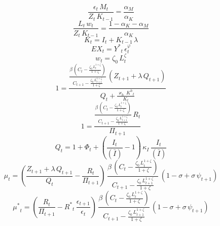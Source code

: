 \begin{dmath}
\frac{{\epsilon}_{t}\, {M}_{t}}{{Z}_{t}\, {K}_{t-1}}=\frac{{\alpha_{M}}}{{\alpha_{K}}}
\end{dmath}
\begin{dmath}
\frac{{L}_{t}\, {w}_{t}}{{Z}_{t}\, {K}_{t-1}}=\frac{1-{\alpha_{K}}-{\alpha_{M}}}{{\alpha_{K}}}
\end{dmath}
\begin{dmath}
{K}_{t}={I}_{t}+{K}_{t-1}\, {\lambda}
\end{dmath}
\begin{dmath}
{EX}_{t}={Y^{*}}_{t}\, {\epsilon}_{t}^{{\varphi}}
\end{dmath}
\begin{dmath}
{w}_{t}={\zeta_{0}}\, {L}_{t}^{{\zeta}}
\end{dmath}
\begin{dmath}
1=\frac{\frac{{\beta}\, \left({C}_{t}-\frac{{\zeta_{0}}\, {L}_{t}^{1+{\zeta}}}{1+{\zeta}}\right)}{{C}_{t+1}-\frac{{\zeta_{0}}\, {L}_{t+1}^{1+{\zeta}}}{1+{\zeta}}}\, \left({Z}_{t+1}+{\lambda}\, {Q}_{t+1}\right)}{{Q}_{t}+\frac{{\varkappa_{h}}\, {K^{h}}_{t}}{{K}_{t}}}
\end{dmath}
\begin{dmath}
1=\frac{\frac{{\beta}\, \left({C}_{t}-\frac{{\zeta_{0}}\, {L}_{t}^{1+{\zeta}}}{1+{\zeta}}\right)}{{C}_{t+1}-\frac{{\zeta_{0}}\, {L}_{t+1}^{1+{\zeta}}}{1+{\zeta}}}\, {R}_{t}}{{\Pi}_{t+1}}
\end{dmath}
\begin{dmath}
{Q}_{t}=1+{\Phi}_{t}+\left(\frac{{I}_{t}}{(\bar{I})}-1\right)\, {\kappa_{I}}\, \frac{{I}_{t}}{(\bar{I})}
\end{dmath}
\begin{dmath}
{\mu}_{t}=\left(\frac{{Z}_{t+1}+{\lambda}\, {Q}_{t+1}}{{Q}_{t}}-\frac{{R}_{t}}{{\Pi}_{t+1}}\right)\, \frac{{\beta}\, \left({C}_{t}-\frac{{\zeta_{0}}\, {L}_{t}^{1+{\zeta}}}{1+{\zeta}}\right)}{{C}_{t+1}-\frac{{\zeta_{0}}\, {L}_{t+1}^{1+{\zeta}}}{1+{\zeta}}}\, \left(1-{\sigma}+{\sigma}\, {\psi}_{t+1}\right)
\end{dmath}
\begin{dmath}
{\mu^{*}}_{t}=\left(\frac{{R}_{t}}{{\Pi}_{t+1}}-{R^{*}}_{t}\, \frac{{\epsilon}_{t+1}}{{\epsilon}_{t}}\right)\, \frac{{\beta}\, \left({C}_{t}-\frac{{\zeta_{0}}\, {L}_{t}^{1+{\zeta}}}{1+{\zeta}}\right)}{{C}_{t+1}-\frac{{\zeta_{0}}\, {L}_{t+1}^{1+{\zeta}}}{1+{\zeta}}}\, \left(1-{\sigma}+{\sigma}\, {\psi}_{t+1}\right)
\end{dmath}
